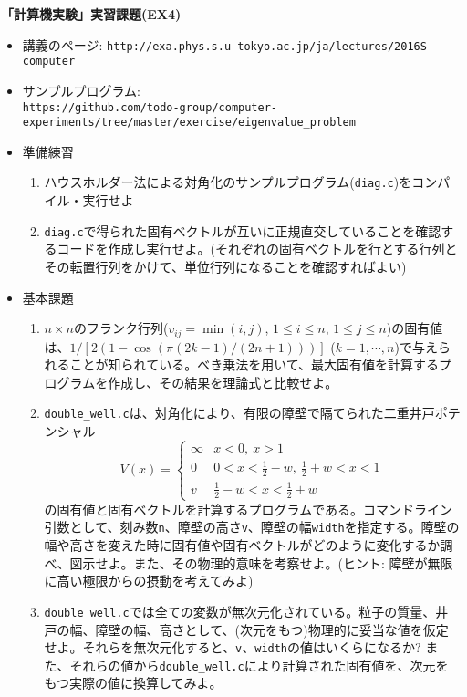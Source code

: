 \documentclass[11pt]{jarticle}
\begin{document}
\noindent
{\bf\large 「計算機実験」実習課題(EX4)}
\\[-0.5em]

\noindent
\begin{itemize}
\item 講義のページ: \verb+http://exa.phys.s.u-tokyo.ac.jp/ja/lectures/2016S-computer+

\item サンプルプログラム: \\ {\small \verb+https://github.com/todo-group/computer-experiments/tree/master/exercise/eigenvalue_problem+}
  
\item 準備練習
  \begin{enumerate}
  \item ハウスホルダー法による対角化のサンプルプログラム({\tt diag.c})をコンパイル・実行せよ
  \item {\tt diag.c}で得られた固有ベクトルが互いに正規直交していることを確認するコードを作成し実行せよ。(それぞれの固有ベクトルを行とする行列とその転置行列をかけて、単位行列になることを確認すればよい)
  \end{enumerate}

\item 基本課題
  \begin{enumerate}
  \item $n \times n$のフランク行列($v_{ij}=\min(i,j)$, $1 \le i \le n$, $1 \le j \le n$)の固有値は、$1/[2 (1 - \cos (\pi (2 k - 1) / (2 n + 1)))]$ ($k=1,\cdots,n$)で与えられることが知られている。べき乗法を用いて、最大固有値を計算するプログラムを作成し、その結果を理論式と比較せよ。
  \item {\tt double\_well.c}は、対角化により、有限の障壁で隔てられた二重井戸ポテンシャル
    \begin{equation*}
      V(x) = \begin{cases}
        \infty & x < 0, \ x > 1 \\
        0 & 0 < x < \frac{1}{2} - w, \ \frac{1}{2}+w < x < 1 \\
        v & \frac{1}{2} - w < x < \frac{1}{2}+w
      \end{cases}
    \end{equation*}
    の固有値と固有ベクトルを計算するプログラムである。コマンドライン引数として、刻み数{\tt n}、障壁の高さ{\tt v}、障壁の幅{\tt width}を指定する。障壁の幅や高さを変えた時に固有値や固有ベクトルがどのように変化するか調べ、図示せよ。また、その物理的意味を考察せよ。(ヒント: 障壁が無限に高い極限からの摂動を考えてみよ)
  \item {\tt double\_well.c}では全ての変数が無次元化されている。粒子の質量、井戸の幅、障壁の幅、高さとして、(次元をもつ)物理的に妥当な値を仮定せよ。それらを無次元化すると、{\tt v}、{\tt width}の値はいくらになるか? また、それらの値から{\tt double\_well.c}により計算された固有値を、次元をもつ実際の値に換算してみよ。
  \end{enumerate}
  

\end{itemize}
\end{document}
